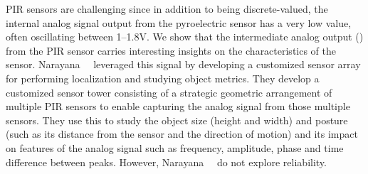 PIR sensors are challenging since in addition to being discrete-valued, the internal analog signal output from the pyroelectric sensor has a very low value, often oscillating between 1--1.8V. We show that the intermediate analog output (\aout) from the PIR sensor carries interesting insights on the characteristics of the sensor. Narayana~\etal~\cite{narayana2015pir} leveraged this signal %
by developing a customized sensor array %
for performing localization and studying object metrics. They develop a customized sensor tower consisting of a strategic geometric arrangement of multiple PIR sensors to enable capturing the analog signal from those multiple sensors. They use this to study the object size (height and width) and posture (such as its distance from the sensor and the direction of motion) and its impact on features of the analog signal such as frequency, amplitude, phase and time difference between peaks. 
However, Narayana~\etal~\cite{narayana2015pir} do not explore reliability.%













